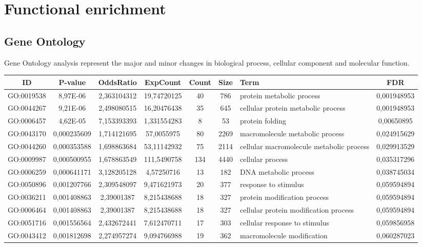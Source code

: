 \documentclass[12pt, a4paper]{report}
\begin{document}
\newpage
\section{Functional enrichment}

\subsection{Gene Ontology}
Gene Ontology analysis represent the major and minor changes in biological process, cellular component and molecular function. 

\begin{table}[H]
	\centering
	\tiny
\begin{tabular}{c|c|c|c|c|c|p{}|c}
	\textbf{ID}&\textbf{P-value}&\textbf{OddsRatio}&\textbf{ExpCount}&\textbf{Count}&\textbf{Size}& \textbf{Term}&\textbf{FDR}\\
	\hline
GO:0019538&	8,97E-06&	2,363104312	&19,74720125&	40&	786&	protein metabolic process	&0,001948953\\
GO:0044267 & 9,21E-06&	2,498080515	&16,20476438&	35&	645	&cellular protein metabolic process&	0,001948953\\
GO:0006457	&4,62E-05	&7,153393393&	1,331554283&	8&	53&	protein folding	&0,00650895\\
GO:0043170	&0,000235609&	1,714121695&	57,0055975&	80&	2269&	macromolecule metabolic process&	0,024915629\\
GO:0044260	&0,000353588&	1,698863684	&53,11142932&	75	&2114&cellular macromolecule metabolic process&	0,029913529\\
GO:0009987	&0,000500955&	1,678863549&	111,5490758&	134	&4440&	cellular process&	0,035317296\\
GO:0006259	&0,000641171& 3,128205128	&4,57250716&	13	&182&	DNA metabolic process&	0,038745034\\
GO:0050896	&0,001207766&	2,309548097	&9,471621973&	20&	377	&response to stimulus&	0,059594894\\
GO:0036211	&0,001408863&	2,39001387	&8,215438688&	18&	327	&protein modification process&	0,059594894\\
GO:0006464	&0,001408863&	2,39001387	&8,215438688&	18&	327	&cellular protein modification process&	0,059594894\\
GO:0051716&	0,001556564&	2,432672441&	7,612470711&	17&	303&	cellular response to stimulus&	0,059856958\\
GO:0043412&	0,001812698&	2,274957274&	9,094766988&	19&	362&	macromolecule modification&	0,060287023\\

\end{tabular}
\end{table}
\end{document}
